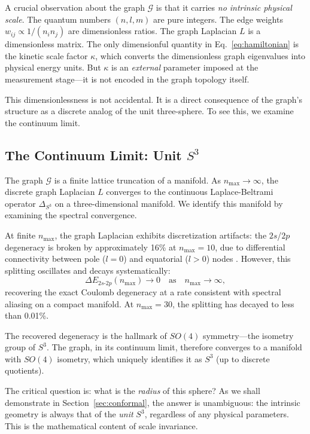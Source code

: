 \documentclass[aps,pra,twocolumn,superscriptaddress,longbibliography]{revtex4-2}
\begin{document}
A crucial observation about the graph $\mathcal{G}$ is that it carries \textit{no intrinsic physical scale}. The quantum numbers $(n, l, m)$ are pure integers. The edge weights $w_{ij} \propto 1/(n_i n_j)$ are dimensionless ratios. The graph Laplacian $L$ is a dimensionless matrix. The only dimensionful quantity in Eq.~\eqref{eq:hamiltonian} is the kinetic scale factor $\kappa$, which converts the dimensionless graph eigenvalues into physical energy units. But $\kappa$ is an \textit{external} parameter imposed at the measurement stage---it is not encoded in the graph topology itself.

This dimensionlessness is not accidental. It is a direct consequence of the graph's structure as a discrete analog of the unit three-sphere. To see this, we examine the continuum limit.

\subsection{The Continuum Limit: Unit $S^3$}

The graph $\mathcal{G}$ is a finite lattice truncation of a manifold. As $n_{\max} \to \infty$, the discrete graph Laplacian $L$ converges to the continuous Laplace-Beltrami operator $\Delta_{S^3}$ on a three-dimensional manifold. We identify this manifold by examining the spectral convergence.

At finite $n_{\max}$, the graph Laplacian exhibits discretization artifacts: the $2s$/$2p$ degeneracy is broken by approximately 16\% at $n_{\max} = 10$, due to differential connectivity between pole ($l = 0$) and equatorial ($l > 0$) nodes \cite{loutey_paper1}. However, this splitting oscillates and decays systematically:
\begin{equation}
\Delta E_{2s\text{-}2p}(n_{\max}) \to 0 \quad \text{as} \quad n_{\max} \to \infty,
\end{equation}
recovering the exact Coulomb degeneracy at a rate consistent with spectral aliasing on a compact manifold. At $n_{\max} = 30$, the splitting has decayed to less than 0.01\%.

The recovered degeneracy is the hallmark of $SO(4)$ symmetry---the isometry group of $S^3$. The graph, in its continuum limit, therefore converges to a manifold with $SO(4)$ isometry, which uniquely identifies it as $S^3$ (up to discrete quotients).

The critical question is: what is the \textit{radius} of this sphere? As we shall demonstrate in Section~\ref{sec:conformal}, the answer is unambiguous: the intrinsic geometry is always that of the \textit{unit} $S^3$, regardless of any physical parameters. This is the mathematical content of scale invariance.
\end{document}
